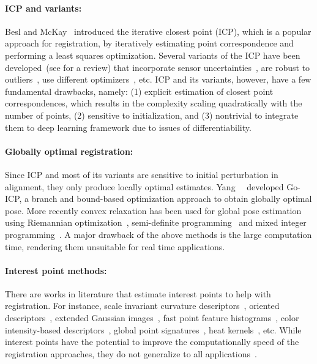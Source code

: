 \documentclass[10pt,twocolumn,letterpaper]{article}
\begin{document}
\paragraph{ICP and variants:}
Besl and McKay~\cite{besl1992method} introduced the iterative closest point (ICP), which is a popular approach for registration, by iteratively estimating point correspondence and performing a least squares optimization. 
Several variants of the ICP have been developed~(see \cite{rusinkiewicz2001} for a review)  that incorporate sensor uncertainties~\cite{segal2009generalized,arun2018probabilistic}, are robust to outliers~\cite{bouaziz2013sparse}, use different optimizers~\cite{fitzgibbon2003robust}, etc. ICP and its variants, however, have a few fundamental drawbacks, namely: (1) explicit estimation of closest point correspondences, which results in the complexity scaling quadratically with the number of points, (2) sensitive to initialization, and (3)  nontrivial to integrate them to deep learning framework due to issues of differentiability. 


\paragraph{Globally optimal registration:} Since ICP and most of its variants are sensitive to initial perturbation in alignment, they only produce locally optimal estimates. Yang~\etal~\cite{Yang13} developed Go-ICP, a branch and bound-based optimization approach to obtain globally optimal pose. More recently convex relaxation has been used for global pose estimation using Riemannian optimization~\cite{rosen2016certifiably}, semi-definite programming~\cite{horowitz2014convex,maron2016point} and mixed integer programming~\cite{izatt2017}. A major drawback of the above methods is the large computation time, rendering them unsuitable for real time applications. 


\paragraph{Interest point methods:}
There are works in literature that estimate interest points to help with registration. For instance, scale invariant curvature descriptors~\cite{gelfand2005robust}, oriented descriptors~\cite{glover2012}, extended Gaussian images~\cite{makadia2006fully}, fast point feature histograms~\cite{rusu2009fast}, color intensity-based descriptors~\cite{godin1994three}, global point signatures~\cite{chua1997point}, heat kernels~\cite{ovsjanikov2010one}, etc. While interest points have the potential to improve the computationally speed of the registration approaches, they do not generalize to all applications~\cite{guo20143d}.
\end{document}
